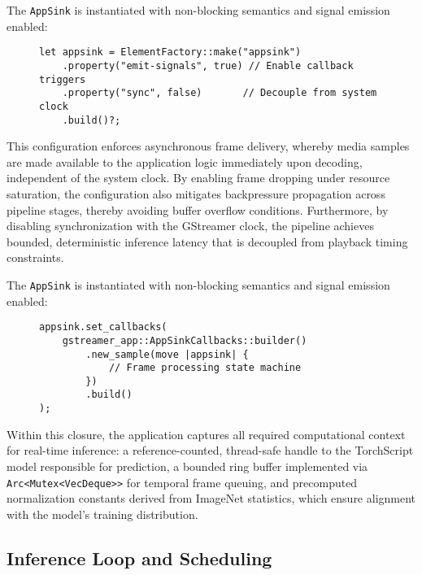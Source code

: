 The \texttt{AppSink} is instantiated with non-blocking semantics and signal emission enabled:

\begin{figure}[htbp]
\centering
\begin{verbatim}
let appsink = ElementFactory::make("appsink")
    .property("emit-signals", true) // Enable callback triggers
    .property("sync", false)       // Decouple from system clock
    .build()?;
\end{verbatim}
\label{lst:appsink_config}
\end{figure}

This configuration enforces asynchronous frame delivery, whereby media samples are made available to the application logic immediately upon decoding, independent of the system clock. By enabling frame dropping under resource saturation, the configuration also mitigates backpressure propagation across pipeline stages, thereby avoiding buffer overflow conditions. Furthermore, by disabling synchronization with the GStreamer clock, the pipeline achieves bounded, deterministic inference latency that is decoupled from playback timing constraints.

The \texttt{AppSink} is instantiated with non-blocking semantics and signal emission enabled:

\begin{figure}[htbp]
\centering
\begin{verbatim}
appsink.set_callbacks(
    gstreamer_app::AppSinkCallbacks::builder()
        .new_sample(move |appsink| {
            // Frame processing state machine
        })
        .build()
);
\end{verbatim}
\label{lst:appsink_callbacks}
\end{figure}

Within this closure, the application captures all required computational context for real-time inference: a reference-counted, thread-safe handle to the TorchScript model responsible for prediction, a bounded ring buffer implemented via \texttt{Arc<Mutex<VecDeque>>} for temporal frame queuing, and precomputed normalization constants derived from ImageNet statistics, which ensure alignment with the model’s training distribution.

\subsection{Inference Loop and Scheduling}
\label{sec:inference_loop}

